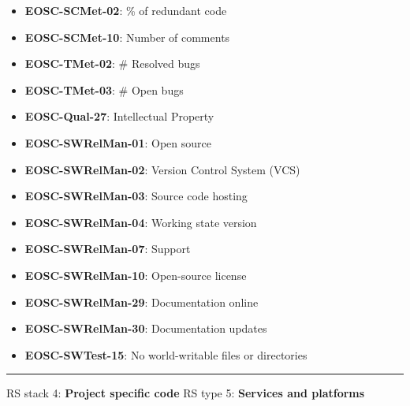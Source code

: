 \begin{itemize}
    \item \textbf{EOSC-SCMet-02}: \% of redundant code
    \item \textbf{EOSC-SCMet-10}: Number of comments
    \item \textbf{EOSC-TMet-02}: \# Resolved bugs
    \item \textbf{EOSC-TMet-03}: \# Open bugs
    \item \textbf{EOSC-Qual-27}: Intellectual Property
    \item \textbf{EOSC-SWRelMan-01}: Open source
    \item \textbf{EOSC-SWRelMan-02}: Version Control System (VCS)
    \item \textbf{EOSC-SWRelMan-03}: Source code hosting
    \item \textbf{EOSC-SWRelMan-04}: Working state version
    \item \textbf{EOSC-SWRelMan-07}: Support
    \item \textbf{EOSC-SWRelMan-10}: Open-source license
    \item \textbf{EOSC-SWRelMan-29}: Documentation online
    \item \textbf{EOSC-SWRelMan-30}: Documentation updates
    \item \textbf{EOSC-SWTest-15}: No world-writable files or directories
\end{itemize}
\hrule

RS stack 4: \textbf{Project specific code} \newline
RS type 5: \textbf{Services and platforms}

